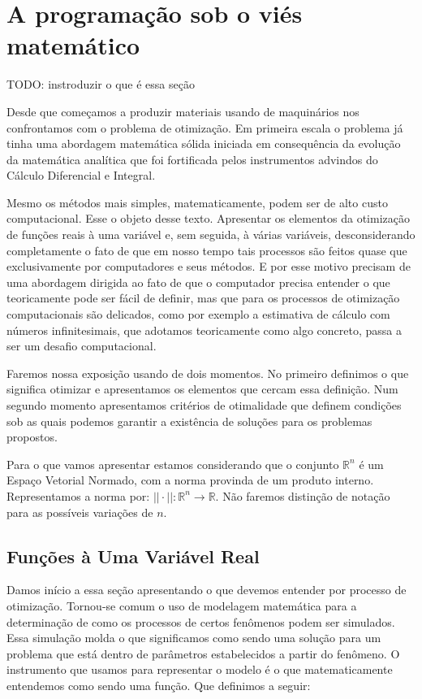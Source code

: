 \section{A programação sob o viés matemático}

TODO: instroduzir o que é essa seção

\par Desde que começamos a produzir materiais usando de maquinários nos confrontamos com o problema de otimização. Em primeira escala o problema já tinha uma abordagem matemática sólida iniciada em consequência da evolução da matemática analítica que foi fortificada pelos instrumentos advindos do Cálculo Diferencial e Integral. 
\par Mesmo os métodos mais simples, matematicamente, podem ser de alto custo computacional. Esse o objeto desse texto. Apresentar os elementos da otimização de funções reais à uma variável e, sem seguida, à várias variáveis, desconsiderando completamente o fato de que em nosso tempo tais processos são feitos quase que exclusivamente por computadores e seus métodos. E por esse motivo precisam de uma abordagem dirigida ao fato de que o computador precisa entender o que teoricamente pode ser fácil de definir, mas que para os processos de otimização computacionais são delicados, como por exemplo a estimativa de cálculo com números infinitesimais, que adotamos teoricamente como algo concreto, passa a ser um desafio computacional. 
\par Faremos nossa exposição usando de dois momentos. No primeiro definimos o que significa otimizar e apresentamos os elementos que cercam essa definição. Num segundo momento apresentamos critérios de otimalidade que definem condições sob as quais podemos garantir a existência de soluções para os problemas propostos.
\par Para o que vamos apresentar estamos considerando que o conjunto $\mathbb{R}^n$ é um Espaço Vetorial Normado, com a norma provinda de um produto interno. Representamos a norma por: $||\cdot ||: \mathbb{R}^n \rightarrow \mathbb{R}$. Não faremos distinção de notação para as possíveis variações de $n$.

\subsection{Funções à Uma Variável Real}

\par Damos início a essa seção apresentando o que devemos entender por processo de otimização. Tornou-se comum o uso de modelagem matemática para a determinação de como os processos de certos fenômenos podem ser simulados. Essa simulação molda o que significamos como sendo uma solução para um problema que está dentro de parâmetros estabelecidos a partir do fenômeno. O instrumento que usamos para representar o modelo é o que matematicamente entendemos como sendo uma função. Que definimos a seguir:

